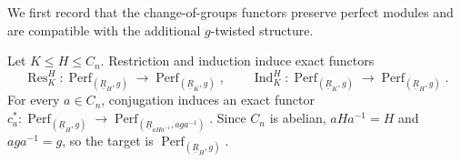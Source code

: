 \documentclass[11pt,oneside]{amsart}
\numberwithin{equation}{section}
\numberwithin{figure}{section}
\theoremstyle{plain}
\theoremstyle{definition}
\theoremstyle{remark}
\begin{document}
We first record that the change-of-groups functors preserve perfect
modules and are compatible with the additional \(g\)-twisted structure.

\begin{lemma}\label{lem:twisted-functor-extends}
Let \(K\leq H\leq C_n\). Restriction and induction induce exact functors
\[
\operatorname{Res}^H_K:
\operatorname{Perf}_{(\underline R_H,g)}
\longrightarrow
\operatorname{Perf}_{(\underline R_K,g)},
\qquad
\operatorname{Ind}^H_K:
\operatorname{Perf}_{(\underline R_K,g)}
\longrightarrow
\operatorname{Perf}_{(\underline R_H,g)}.
\]
For every \(a\in C_n\), conjugation induces an exact functor
\(
c_a^*:
\operatorname{Perf}_{(\underline R_H,g)}
\longrightarrow
\operatorname{Perf}_{(\underline R_{aHa^{-1}},aga^{-1})}.
\)
Since \(C_n\) is abelian, \(aHa^{-1}=H\) and \(aga^{-1}=g\), so the
target is \(\operatorname{Perf}_{(\underline R_H,g)}\).
\end{lemma}

 
\end{document}
